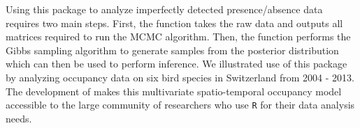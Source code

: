 Using this package to analyze imperfectly detected presence/absence data requires two main steps. First, the  function takes the raw data and outputs all matrices required to run the MCMC algorithm. Then, the  function performs the Gibbs sampling algorithm to generate samples from the posterior distribution which can then be used to perform inference. We illustrated use of this package by analyzing occupancy data on six bird species in Switzerland from 2004 - 2013. The development of  makes this multivariate spatio-temporal occupancy model accessible to the large community of researchers who use \texttt{R} for their data analysis needs. 



\newpage

\address{Staci Hepler\\
Department of Statistical Sciences,	Wake Forest University \\
  Winston-Salem NC, 27103
  USA\\
  }

\address{Robert Erhardt\\
 Department of Statistical Sciences,	 Wake Forest University\\
  Winston-Salem NC, 27103
  USA\\
  }
